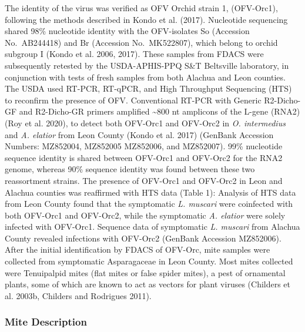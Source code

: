 \documentclass[12pt,final,CPage]{ufthesis}
\begin{document}
{  The identity of the virus was verified as OFV Orchid strain 1, (OFV-Orc1), following the methods described in Kondo et al. (2017). Nucleotide sequencing shared 98\% nucleotide identity with the OFV-isolates So (Accession No.~AB244418) and Br (Accession No.~MK522807), which belong to orchid subgroup I (Kondo et al. 2006, 2017). These samples from FDACS were subsequently retested by the USDA-APHIS-PPQ S\&T Beltsville laboratory, in conjunction with tests of fresh samples from both Alachua and Leon counties. The USDA used RT-PCR, RT-qPCR, and High Throughput Sequencing (HTS) to reconfirm the presence of OFV. Conventional RT-PCR with Generic R2-Dicho-GF and R2-Dicho-GR primers amplified \textasciitilde800 nt amplicons of the L-gene (RNA2) (Roy et al. 2020), to detect both OFV-Orc1 and OFV-Orc2 in \emph{O. intermedius} and \emph{A. elatior} from Leon County (Kondo et al. 2017) (GenBank Accession Numbers: MZ852004, MZ852005 MZ852006, and MZ852007). 99\% nucleotide sequence identity is shared between OFV-Orc1 and OFV-Orc2 for the RNA2 genome, whereas 90\% sequence identity was found between these two reassortment strains. The presence of OFV-Orc1 and OFV-Orc2 in Leon and Alachua counties was reaffirmed with HTS data (Table 1): Analysis of HTS data from Leon County found that the symptomatic \emph{L. muscari} were coinfected with both OFV-Orc1 and OFV-Orc2, while the symptomatic \emph{A. elatior} were solely infected with OFV-Orc1. Sequence data of symptomatic \emph{L. muscari} from Alachua County revealed infections with OFV-Orc2 (GenBank Accession MZ852006). After the initial identification by FDACS of OFV-Orc, mite samples were collected from symptomatic Asparagaceae in Leon County. Most mites collected were Tenuipalpid mites (flat mites or false spider mites), a pest of ornamental plants, some of which are known to act as vectors for plant viruses (Childers et al. 2003b, Childers and Rodrigues 2011).

  \hypertarget{mite-description}{%
  \subsubsection{Mite Description}\label{mite-description}}

}
\end{document}
